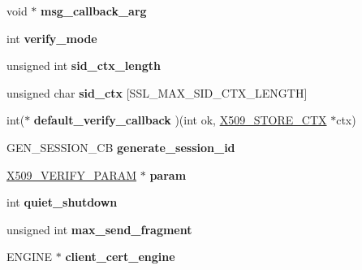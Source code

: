 \begin{DoxyCompactItemize}
\mbox{\label{structssl__ctx__st_ad1aba043a97ea40fcb8a39e65698f8c0}} 
void $\ast$ {\bfseries msg\+\_\+callback\+\_\+arg}
\item 
\mbox{\label{structssl__ctx__st_a31f82e30439244c12f51daff24fd40d8}} 
int {\bfseries verify\+\_\+mode}
\item 
\mbox{\label{structssl__ctx__st_a59afab8285fbc901d590ab6edaa75bd0}} 
unsigned int {\bfseries sid\+\_\+ctx\+\_\+length}
\item 
\mbox{\label{structssl__ctx__st_a92f94c2a4612e04ec3c075c76aae5553}} 
unsigned char {\bfseries sid\+\_\+ctx} \mbox{[}S\+S\+L\+\_\+\+M\+A\+X\+\_\+\+S\+I\+D\+\_\+\+C\+T\+X\+\_\+\+L\+E\+N\+G\+TH\mbox{]}
\item 
\mbox{\label{structssl__ctx__st_aa6c4ede4479002d346cee1bb1be14a46}} 
int($\ast$ {\bfseries default\+\_\+verify\+\_\+callback} )(int ok, \hyperlink{structx509__store__ctx__st}{X509\+\_\+\+S\+T\+O\+R\+E\+\_\+\+C\+TX} $\ast$ctx)
\item 
\mbox{\label{structssl__ctx__st_a4485f799f50830d69fa26e7514b032dc}} 
G\+E\+N\+\_\+\+S\+E\+S\+S\+I\+O\+N\+\_\+\+CB {\bfseries generate\+\_\+session\+\_\+id}
\item 
\mbox{\label{structssl__ctx__st_a27c15c2ea4e216baacb44a5bf166cfa1}} 
\hyperlink{structX509__VERIFY__PARAM__st}{X509\+\_\+\+V\+E\+R\+I\+F\+Y\+\_\+\+P\+A\+R\+AM} $\ast$ {\bfseries param}
\item 
\mbox{\label{structssl__ctx__st_a325f28f265dae1b20da7c813e41bdb96}} 
int {\bfseries quiet\+\_\+shutdown}
\item 
\mbox{\label{structssl__ctx__st_aab1f54a0e69246d749a6f6ad249c2176}} 
unsigned int {\bfseries max\+\_\+send\+\_\+fragment}
\item 
\mbox{\label{structssl__ctx__st_ae6bb617a63017d5c8e7eccc6f8030185}} 
E\+N\+G\+I\+NE $\ast$ {\bfseries client\+\_\+cert\+\_\+engine}
\item 
\mbox{\label{structssl__ctx__st_aa6c57ade4e374ba2092309192e700b45}} 

\end{DoxyCompactItemize}

